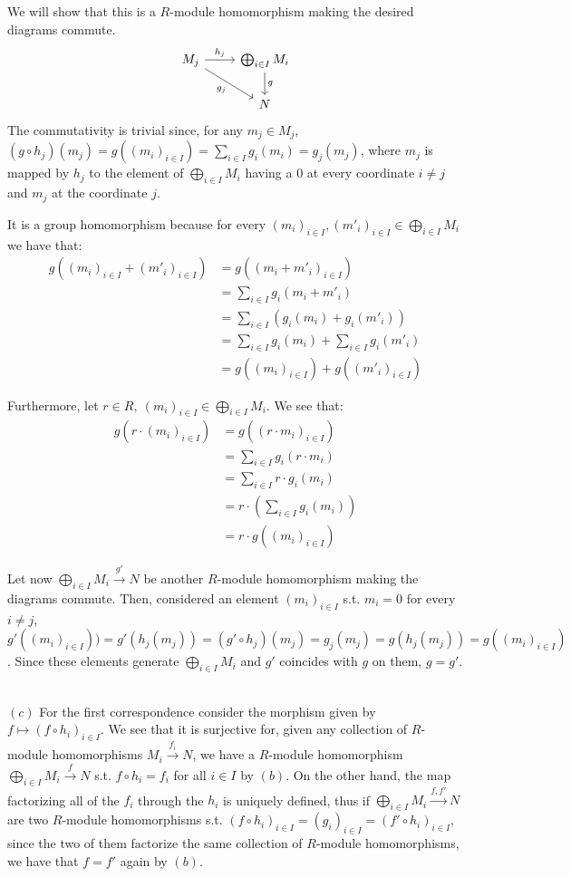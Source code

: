 \documentclass{article}
\begin{document}
We will show that this is a $R$-module homomorphism making the desired diagrams
commute.
\[
    \begin{tikzcd}
        M_j\arrow{r}{h_j}\arrow[swap]{dr}{g_j}
        & \bigoplus_{i\in I} M_i\arrow{d}{g} \\
        & N
    \end{tikzcd}
\]
The commutativity is trivial since, for any $m_j\in M_j$, $(g\circ
h_j)(m_j)=g((m_i)_{i\in I})=\sum_{i\in I} g_i(m_i)=g_j(m_j)$, where $m_j$ is
mapped by $h_j$ to the element of $\bigoplus_{i\in I} M_i$ having a
0 at every coordinate $i\neq j$ and $m_j$ at the coordinate $j$.

It is a group homomorphism because for every $(m_i)_{i\in I}, (m'_i)_{i\in I}\in
\bigoplus_{i\in I} M_i$ we have that:
\begin{align*}
    g((m_i)_{i\in I}+(m'_i)_{i\in I}) & =g((m_i+m'_i)_{i\in I}) \\
    & =\sum_{i\in I} g_i(m_i+m'_i) \\
    & =\sum_{i\in I} (g_i(m_i)+g_i(m'_i)) \\
    & =\sum_{i\in I} g_i(m_i)+\sum_{i\in I} g_i(m'_i) \\
    & =g((m_i)_{i\in I})+g((m'_i)_{i\in I})
\end{align*}

Furthermore, let $r\in R,\ (m_i)_{i\in I}\in\bigoplus_{i\in I} M_i$. We see
that:
\begin{align*}
    g(r\cdot (m_i)_{i\in I}) & =g((r\cdot m_i)_{i\in I}) \\
    & =\sum_{i\in I} g_i(r\cdot m_i) \\
    & =\sum_{i\in I} r\cdot g_i(m_i) \\
    & =r\cdot\left(\sum_{i\in I} g_i(m_i)\right) \\
    & =r\cdot g((m_i)_{i\in I})
\end{align*}

Let now $\bigoplus_{i\in I} M_i\xrightarrow{g'} N$ be another $R$-module
homomorphism making the diagrams commute. Then, considered an element
$(m_i)_{i\in I}$ s.t. $m_i=0$ for every $i\neq j$, $g'( (m_i)_{i\in
I}))=g'(h_j(m_j))=(g'\circ h_j)(m_j)=g_j(m_j)=g(h_j(m_j))=g((m_i)_{i\in I})$.
Since these elements generate $\bigoplus_{i\in I} M_i$ and $g'$ coincides with
$g$ on them, $g=g'$.

~\\
$(c)$ For the first correspondence consider the morphism given by $f\mapsto
(f\circ h_i)_{i\in I}$. We see that it is surjective for, given any collection
of $R$-module homomorphisms $M_i\xrightarrow{f_i} N$, we have a $R$-module 
homomorphism $\bigoplus_{i\in I} M_i\xrightarrow{f} N$ s.t. $f\circ h_i=f_i$ for
all $i\in I$ by $(b)$. On the other hand, the map factorizing all of the $f_i$
through the $h_i$ is
uniquely defined, thus if $\bigoplus_{i\in I} M_i\xrightarrow{f,f'} N$ are two $R$-module 
homomorphisms s.t. $(f\circ h_i)_{i\in I}=(g_i)_{i\in I}=(f'\circ h_i)_{i\in I}$,
since the two of them factorize the same collection of $R$-module homomorphisms,
we have that $f=f'$ again by $(b)$.
\end{document}
